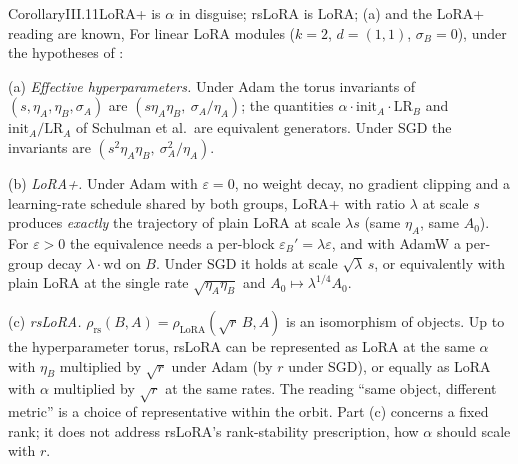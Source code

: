\begin{restate}{Corollary}{III.11}{LoRA+ is $\alpha$ in disguise; rsLoRA is LoRA; (a) and the LoRA+ reading are known, \citet{schulman2025lora}}
For linear LoRA modules ($k=2$, $d=(1,1)$, $\sigma_B=0$), under the hypotheses of :

(a) \emph{Effective hyperparameters.} Under Adam the torus invariants of $(s,\eta_A,\eta_B,\sigma_A)$ are
$(s\eta_A\eta_B,\ \sigma_A/\eta_A)$; the quantities $\alpha\cdot\mathrm{init}_A\cdot\mathrm{LR}_B$ and
$\mathrm{init}_A/\mathrm{LR}_A$ of Schulman et al.\ are equivalent generators. Under SGD the invariants are
$(s^2\eta_A\eta_B,\ \sigma_A^2/\eta_A)$.

(b) \emph{LoRA+.} Under Adam with $\varepsilon=0$, no weight decay, no gradient clipping and a learning-rate schedule
shared by both groups, LoRA+ with ratio $\lambda$ at scale $s$ produces \emph{exactly} the trajectory of plain LoRA at
scale $\lambda s$ (same $\eta_A$, same $A_0$). For $\varepsilon>0$ the equivalence needs a per-block
$\varepsilon_B'=\lambda\varepsilon$, and with AdamW a per-group decay $\lambda\cdot\mathrm{wd}$ on $B$. Under SGD it holds at
scale $\sqrt\lambda\,s$, or equivalently with plain LoRA at the single rate $\sqrt{\eta_A\eta_B}$ and
$A_0\mapsto\lambda^{1/4}A_0$.

(c) \emph{rsLoRA.} $\rho_{\mathrm{rs}}(B,A)=\rho_{\mathrm{LoRA}}(\sqrt r\,B,A)$ is an isomorphism of objects. Up to the
hyperparameter torus, rsLoRA can be represented as LoRA at the same $\alpha$ with $\eta_B$ multiplied by $\sqrt r$ under
Adam (by $r$ under SGD), or equally as LoRA with $\alpha$ multiplied by $\sqrt r$ at the same rates. The reading ``same
object, different metric'' is a choice of representative within the orbit. Part (c) concerns a fixed rank; it does not
address rsLoRA's rank-stability prescription, how $\alpha$ should scale with $r$.
\end{restate}

